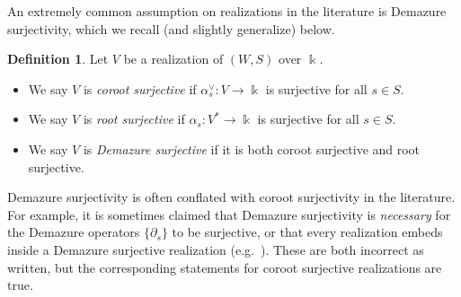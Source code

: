 \documentclass{amsart}
\theoremstyle{plain}
\newtheorem{lem}[thm]{Lemma}
\theoremstyle{definition}
\newtheorem{defn}[thm]{Definition}
\theoremstyle{remark}
\numberwithin{equation}{section}
\newcommand{\defnemph}[1]{\emph{#1}}
\begin{document}
An extremely common assumption on realizations in the literature is Demazure surjectivity, which we recall (and slightly generalize) below.

\begin{defn} \label{defn:demazuresurj}
Let $V$ be a realization of $(W,S)$ over $\Bbbk$.
\begin{itemize}
\item We say $V$ is \defnemph{coroot surjective} if $\alpha_s^\vee : V \rightarrow \Bbbk$ is surjective for all $s \in S$.

\item We say $V$ is \defnemph{root surjective} if $\alpha_s : V^\ast \rightarrow \Bbbk$ is surjective for all $s \in S$.

\item We say $V$ is \defnemph{Demazure surjective} if it is both coroot surjective and root surjective.
\end{itemize}
\end{defn}


Demazure surjectivity is often conflated with coroot surjectivity in the literature. 
For example, it is sometimes claimed that Demazure surjectivity is \emph{necessary} for the Demazure operators $\{\partial_s\}$ to be surjective, or that every realization embeds inside a Demazure surjective realization (e.g.~\cite[\S 2.3]{gjw-calcpcanbasis}). 
These are both incorrect as written, but the corresponding statements for coroot surjective realizations are true.

%
%
\end{document}
